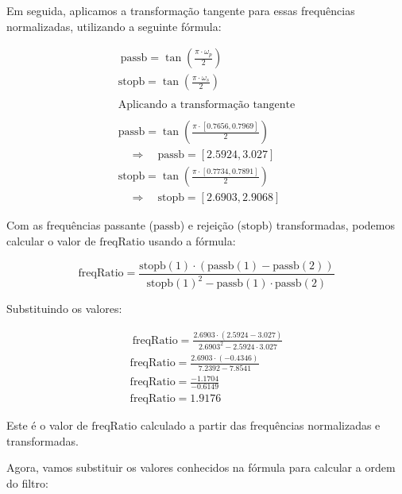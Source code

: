 Em seguida, aplicamos a transformação tangente para essas frequências normalizadas, utilizando a seguinte fórmula:

\begin{align*} \
    \text{passb} = \tan\left(\frac{\pi \cdot \omega_p}{2}\right)         \\
    \text{stopb} = \tan\left(\frac{\pi \cdot \omega_s}{2}\right)         \\
    \\
    \text{Aplicando a transformação tangente}                            \\
    \\
    \text{passb} = \tan\left(\frac{\pi \cdot [0.7656, 0.7969]}{2}\right) \\ \quad \Rightarrow \quad \text{passb} = [2.5924, 3.027] \\
    \text{stopb} = \tan\left(\frac{\pi \cdot [0.7734, 0.7891]}{2}\right) \\ \quad \Rightarrow \quad \text{stopb} = [2.6903, 2.9068]
\end{align*}


Com as frequências passante ($\text{passb}$) e rejeição ($\text{stopb}$) transformadas, podemos calcular o valor de $\text{freqRatio}$ usando a fórmula:

$$
    \text{freqRatio} = \frac{\text{stopb}(1) \cdot (\text{passb}(1) - \text{passb}(2))}{\text{stopb}(1)^2 - \text{passb}(1) \cdot \text{passb}(2)}
$$

Substituindo os valores:

\begin{align*} \
    \text{freqRatio} = \frac{2.6903 \cdot (2.5924 - 3.027)}{2.6903^2 - 2.5924 \cdot 3.027} \\
    \text{freqRatio} = \frac{2.6903 \cdot (-0.4346)}{7.2392 - 7.8541}                      \\
    \text{freqRatio} = \frac{-1.1704}{-0.6149}                                             \\
    \text{freqRatio} = 1.9176
\end{align*}

Este é o valor de $\text{freqRatio}$ calculado a partir das frequências normalizadas e transformadas.

Agora, vamos substituir os valores conhecidos na fórmula para calcular a ordem do filtro:

